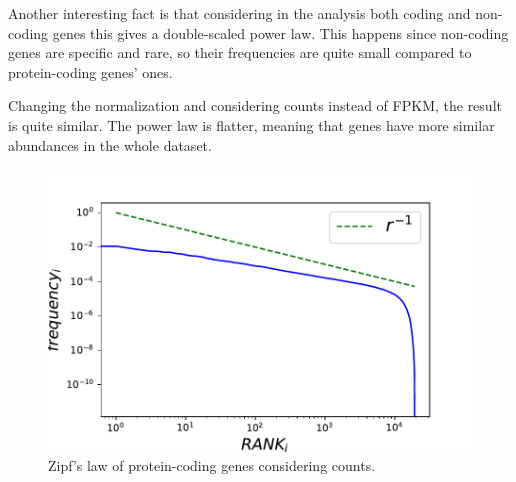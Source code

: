 Another interesting fact is that considering in the analysis both coding and non-coding genes this gives a double-scaled power law. This happens since non-coding genes are specific and rare, so their frequencies are quite small compared to protein-coding genes' ones.

Changing the normalization and considering counts instead of FPKM, the result is quite similar. The power law is flatter, meaning that genes have more similar abundances in the whole dataset. 
\begin{figure}[htb!]
    \centering
    \includegraphics[width=0.8\linewidth]{pictures/structure/tcga/globalzipf_counts.pdf}
    \caption{Zipf's law of protein-coding genes considering counts.}
    \label{fig:structure/tcga/globalzipf_count}
\end{figure}

